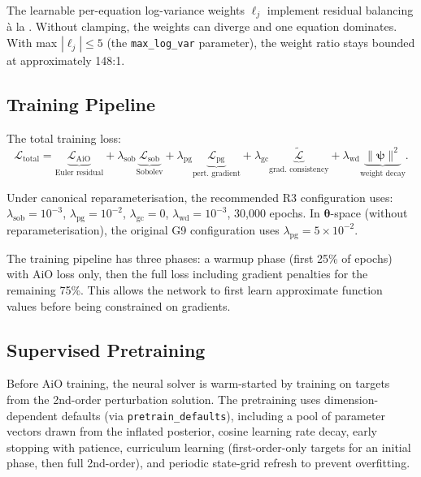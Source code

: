 \documentclass[11pt,a4paper]{article}
\theoremstyle{definition}
\newcommand{\btheta}{\boldsymbol{\theta}}
\newcommand{\bpsi}{\boldsymbol{\psi}}
\newcommand{\code}[1]{\texttt{\color{codecolor}#1}}
\begin{document}
	The learnable per-equation log-variance weights $\ell_j$ implement residual balancing \`{a} la \citet{kendall2018}.
	Without clamping, the weights can diverge and one equation dominates.
	With max $|\ell_j| \leq 5$ (the \code{max\_log\_var} parameter), the weight ratio stays bounded at approximately 148:1.
	
	\subsection{Training Pipeline}
	\label{sec:training_pipeline}
	
	The total training loss:
	\begin{equation}\label{eq:total_loss}
		\mathcal{L}_{\mathrm{total}} = \underbrace{\mathcal{L}_{\mathrm{AiO}}}_{\text{Euler residual}} + \lambda_{\mathrm{sob}} \underbrace{\mathcal{L}_{\mathrm{sob}}}_{\text{Sobolev}} + \lambda_{\mathrm{pg}} \underbrace{\mathcal{L}_{\mathrm{pg}}}_{\text{pert.\ gradient}} + \lambda_{\mathrm{gc}} \underbrace{\widetilde{\mathcal{L}}}_{\text{grad.\ consistency}} + \lambda_{\mathrm{wd}} \underbrace{\|\bpsi\|^2}_{\text{weight decay}}.
	\end{equation}
	
	Under canonical reparameterisation, the recommended R3 configuration uses: $\lambda_{\mathrm{sob}} = 10^{-3}$, $\lambda_{\mathrm{pg}} = 10^{-2}$, $\lambda_{\mathrm{gc}} = 0$, $\lambda_{\mathrm{wd}} = 10^{-3}$, 30{,}000 epochs.
	In $\btheta$-space (without reparameterisation), the original G9 configuration uses $\lambda_{\mathrm{pg}} = 5 \times 10^{-2}$.
	
	The training pipeline has three phases: a warmup phase (first 25\% of epochs) with AiO loss only, then the full loss including gradient penalties for the remaining 75\%.
	This allows the network to first learn approximate function values before being constrained on gradients.
	
	\subsection{Supervised Pretraining}
	\label{sec:pretrain}
	
	Before AiO training, the neural solver is warm-started by training on targets from the 2nd-order perturbation solution.
	The pretraining uses dimension-dependent defaults (via \code{pretrain\_defaults}), including a pool of parameter vectors drawn from the inflated posterior, cosine learning rate decay, early stopping with patience, curriculum learning (first-order-only targets for an initial phase, then full 2nd-order), and periodic state-grid refresh to prevent overfitting.
	
\end{document}
